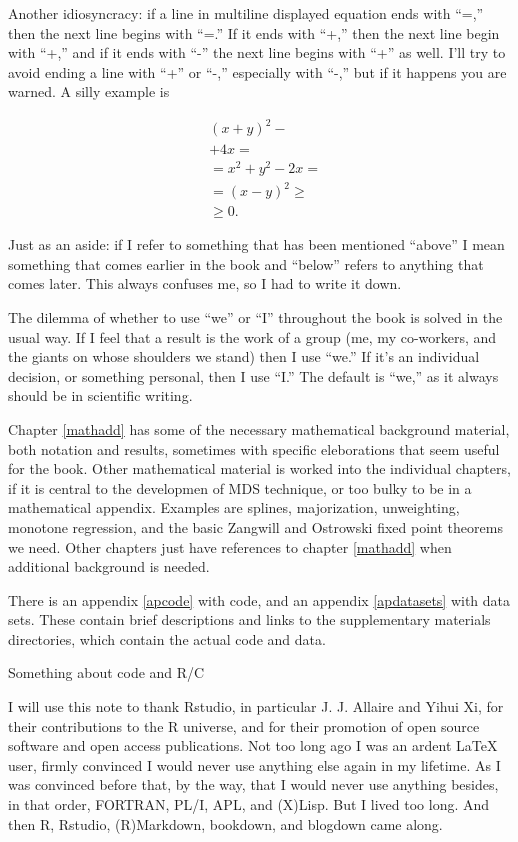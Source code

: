 \documentclass[
  12pt,
]{book}
\theoremstyle{definition}
\theoremstyle{definition}
\theoremstyle{definition}
\theoremstyle{definition}
\theoremstyle{remark}
\begin{document}
Another idiosyncracy: if a line in multiline displayed equation ends
with ``=,'' then the next line begins with ``=.'' If it ends with ``+,'' then
the next line begin with ``+,'' and if it ends with ``-'' the next line
begins with ``+'' as well. I'll try to avoid ending a line with ``+'' or
``-,'' especially with ``-,'' but if it happens you are warned. A silly
example is

\begin{align}
&(x+y)^2-\\
&+4x=\\
&=x^2+y^2-2x=\\
&=(x-y)^2\geq\\
&\geq 0.
\end{align}

Just as an aside: if I refer to something that has been mentioned
``above'' I mean something that comes earlier in the book and ``below''
refers to anything that comes later. This always confuses me, so I had
to write it down.

The dilemma of whether to use ``we'' or ``I'' throughout the book is solved
in the usual way. If I feel that a result is the work of a group (me, my
co-workers, and the giants on whose shoulders we stand) then I use ``we.''
If it's an individual decision, or something personal, then I use ``I.''
The default is ``we,'' as it always should be in scientific writing.

Chapter \ref{mathadd} has some of the necessary mathematical background
material, both notation and results, sometimes with specific
eleborations that seem useful for the book. Other mathematical material
is worked into the individual chapters, if it is central to the
developmen of MDS technique, or too bulky to be in a mathematical
appendix. Examples are splines, majorization, unweighting, monotone
regression, and the basic Zangwill and Ostrowski fixed point theorems we
need. Other chapters just have references to chapter \ref{mathadd} when
additional background is needed.

There is an appendix \ref{apcode} with code, and an appendix
\ref{apdatasets} with data sets. These contain brief descriptions and
links to the supplementary materials directories, which contain the
actual code and data.

Something about code and R/C

I will use this note to thank Rstudio, in particular J. J. Allaire and
Yihui Xi, for their contributions to the R universe, and for their
promotion of open source software and open access publications. Not too
long ago I was an ardent LaTeX user, firmly convinced I would never use
anything else again in my lifetime. As I was convinced before that, by
the way, that I would never use anything besides, in that order,
FORTRAN, PL/I, APL, and (X)Lisp. But I lived too long. And then R,
Rstudio, (R)Markdown, bookdown, and blogdown came along.
\end{document}
